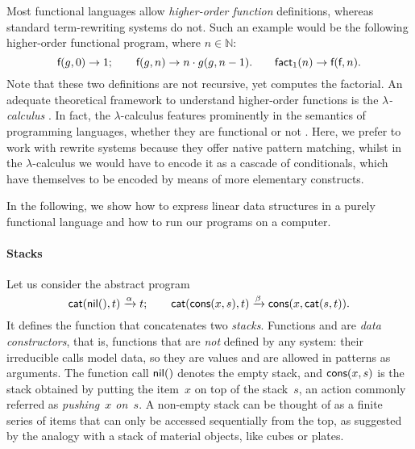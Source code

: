 Most functional languages allow \emph{higher-order
  function}
definitions, whereas standard term\hyp{}rewriting systems do not. Such
an example would be the following higher\hyp{}order functional
program, where \(n \in \mathbb{N}\):
\begin{equation*}
\textsf{f}(g,0) \rightarrow 1;
\qquad
\textsf{f}(g,n) \rightarrow n \cdot g(g,n-1).
\qquad
\textsf{fact}_1(n) \rightarrow \textsf{f}(\textsf{f},n).
\end{equation*}
Note that these two definitions are not recursive, yet
 computes the
factorial. An adequate theoretical
framework to understand higher\hyp{}order functions is the
\emph{\(\lambda\)-calculus}\hspace*{-2.1pt}
\citep{HindleySeldin_2008,VanLeeuwen_1990b}.
 In fact, the
\(\lambda\)-calculus features prominently in the semantics of
programming languages, whether they are functional or not
\citep{Winskel_1993,Reynolds_1998,Pierce_2002,FriedmanWand_2008,TurbakGifford_2008}. Here,
we prefer to work with rewrite systems because they offer native
pattern matching, whilst in the
\(\lambda\)-calculus we
would have to encode it as a cascade of conditionals, which have
themselves to be encoded by means of more elementary constructs.

In the following, we show how to express linear data structures in a
purely functional language and how to run our programs on a computer.

\paragraph{Stacks}
\label{par:stacks}

Let us consider the abstract program
\begin{equation*}
\textsf{cat}(\textsf{nil}(),t)     \xrightarrow{\smash{\alpha}} t;\qquad
\textsf{cat}(\textsf{cons}(x,s),t) \xrightarrow{\smash{\beta}}
                                \textsf{cons}(x,\textsf{cat}(s,t)).
\end{equation*}
It defines the function  that
concatenates  two \emph{stacks}. Functions
 and  are \emph{data
constructors}, that is,
functions that are \emph{not} defined by any system: their irreducible
calls model data, so they are values and are allowed in patterns as
arguments. The function call \(\textsf{nil}()\) denotes the empty stack,
and \(\textsf{cons}(x,s)\) is the stack obtained by putting the
item~\(x\) on top of the stack~\(s\), an action commonly referred as
\textsl{pushing~\(x\) on~\(s\)}. A non\hyp{}empty stack can be thought
of as a finite series of items that can only be accessed sequentially
from the top, as suggested by the analogy with a stack of material
objects, like cubes or plates.

